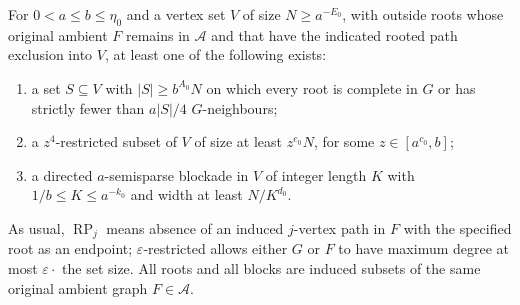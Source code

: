 \documentclass[11pt,a4paper]{article}
\theoremstyle{definition}
\theoremstyle{remark}
\numberwithin{equation}{section}
\DeclareMathOperator{\RP}{RP}
\begin{document}
For \(0<a\le b\le \eta_{0}\) and a vertex set \(V\) of size \(N\ge a^{-E_{0}}\), with outside roots whose original ambient \(F\) remains in \(\mathcal A\) and that have the indicated rooted path exclusion into \(V\), at least one of the following exists:
\begin{enumerate}[label=(\(L_{\arabic*}\))]
\item a set \(S\subseteq V\) with \(|S|\ge b^{A_{0}} N\) on which every root is complete in \(G\) or has strictly fewer than \(a|S|/4\) \(G\)-neighbours;
\item a \(z^{4}\)-restricted subset of \(V\) of size at least \(z^{e_{0}} N\), for some \(z\in[a^{c_{0}},b]\);
\item a directed \(a\)-semisparse blockade in \(V\) of integer length \(K\) with \(1/b\le K\le a^{-k_{0}}\) and width at least \(N/K^{d_{0}}\).
\end{enumerate}

As usual, \(\RP_{j}\) means absence of an induced \(j\)-vertex path in \(F\) with the specified root as an endpoint; \(\varepsilon\)-restricted allows either \(G\) or \(F\) to have maximum degree at most \(\varepsilon \cdot \) the set size. All roots and all blocks are induced subsets of the same original ambient graph \(F\in\mathcal A\).
\end{document}
